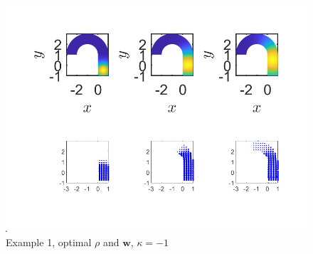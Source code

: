 \documentclass[11pt, a4paper]{article}
\theoremstyle{definition}
\newcommand{\w}{\mathbf{w}}
\begin{document}
\begin{figure}[h]
	\centering
	\includegraphics[scale=0.6]{Opt1n1.png}
	\caption{Example 1, optimal $\rho$ and $\w$, $\kappa = -1$} 
	\label{FEx1b}
\end{figure}
\end{document}
